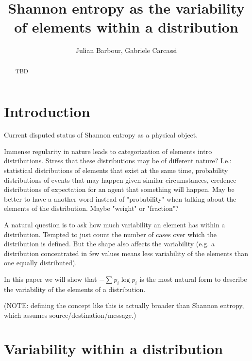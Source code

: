 \documentclass{article}
\title{Shannon entropy as the variability of elements within a distribution}
\author{
	Julian Barbour, 
	Gabriele Carcassi
}
\begin{document}
\maketitle

\begin{abstract}
TBD
\end{abstract}




\section{Introduction}

Current disputed status of Shannon entropy as a physical object.

Immense regularity in nature leads to categorization of elements intro distributions. Stress that these distributions may be of different nature? I.e.: statistical distributions of elements that exist at the same time, probability distributions of events that may happen given similar circumstances, credence distributions of expectation for an agent that something will happen. May be better to have a another word instead of "probability" when talking about the elements of the distribution. Maybe "weight" or "fraction"?

A natural question is to ask how much variability an element has within a distribution. Tempted to just count the number of cases over which the distribution is defined. But the shape also affects the variability (e.g. a distribution concentrated in few values means less variability of the elements than one equally distributed).

In this paper we will show that $- \sum p_i \log p_i$ is the most natural form to describe the variability of the elements of a distribution.

(NOTE: defining the concept like this is actually broader than Shannon entropy, which assumes source/destination/message.)

\section{Variability within a distribution}
\end{document}
